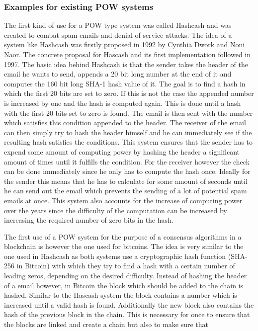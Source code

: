 \subsubsection{Examples for existing POW systems}

The first kind of use for a POW type system was called Hashcash and was created to combat spam emails and denial of service attacks. The idea of a system like Hashcash was firstly proposed in 1992
by Cynthia Dwork and Noni Naor.\cite{url:pow_email} The concrete proposal for Hascash and its first implementation followed in 1997.\cite{url:hashcash} The basic idea behind Hashcash is that
the sender takes the header of the email he wants to send, appends a 20 bit long number at the end of it and computes the 160 bit long SHA-1 hash value of it. The goal is to find a hash in which the first 20 bits
are set to zero. If this is not the case the appended number is increased by one and the hash is computed again. This is done until a hash with the first 20 bits set to zero is found. The email
is then sent with the number which satisfies this condition appended to the header. The receiver of the email can then simply try to hash the header himself and he can immediately see if the resulting
hash satisfies the conditions. This system ensures that the sender has to expend some amount of computing power by hashing the header a significant amount of times until it fulfills the condition.
For the receiver however the check can be done immediately since he only has to compute the hash once. Ideally for the sender this means that he has to calculate for some amount of seconds until
he can send out the email which prevents the sending of a lot of potential spam emails at once. This system also accounts for the increase of computing power over the years since the difficulty of
the computation can be increased by increasing the required number of zero bits in the hash.\par
The first use of a POW system for the purpose of a consensus algorithms in a blockchain is however the one used for bitcoins. The idea is very similar to the one used in Hashcash as both systems use a
cryptographic hash function (SHA-256 in Bitcoin) with which they try to find a hash with a certain number of leading zeros, depending on the desired difficulty. Instead of hashing the header of a email
however, in Bitcoin the block which should be added to the chain is hashed. Similar to the Hascash system the block contains a number which is increased until a valid hash is found.
Additionally the new block also contains the hash of the previous block in the chain. This is necessary for once to ensure that the blocks are linked and create a chain but also to make sure that
